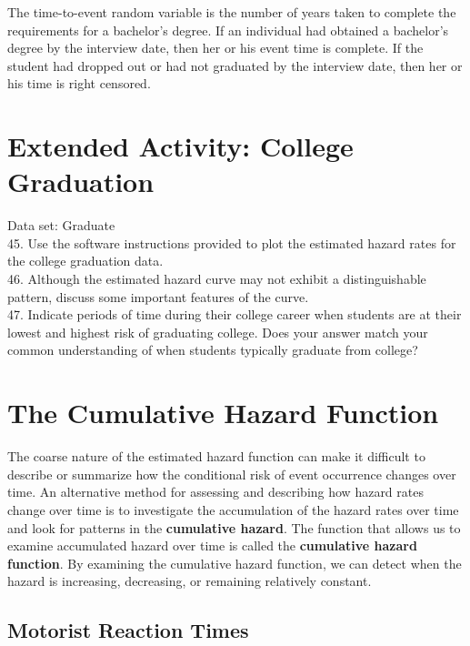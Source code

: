 \documentclass[
]{report}
\begin{document}
The time-to-event random variable is the number of years taken to complete the requirements for a bachelor's degree. If an individual had obtained a bachelor's degree by the interview date, then her or his event time is complete. If the student had dropped out or had not graduated by the interview date, then her or his time is right censored.

\section*{Extended Activity: College Graduation}\label{extended-activity-college-graduation}

Data set: Graduate\\
45. Use the software instructions provided to plot the estimated hazard rates for the college graduation data.\\
46. Although the estimated hazard curve may not exhibit a distinguishable pattern, discuss some important features of the curve.\\
47. Indicate periods of time during their college career when students are at their lowest and highest risk of graduating college. Does your answer match your common understanding of when students typically graduate from college?

\section{\texorpdfstring{\textbf{The Cumulative Hazard Function}}{The Cumulative Hazard Function}}\label{the-cumulative-hazard-function}

The coarse nature of the estimated hazard function can make it difficult to describe or summarize how the conditional risk of event occurrence changes over time. An alternative method for assessing and describing how hazard rates change over time is to investigate the accumulation of the hazard rates over time and look for patterns in the \textbf{cumulative hazard}. The function that allows us to examine accumulated hazard over time is called the \textbf{cumulative hazard function}. By examining the cumulative hazard function, we can detect when the hazard is increasing, decreasing, or remaining relatively constant.

\subsection*{Motorist Reaction Times}\label{motorist-reaction-times}
\end{document}
